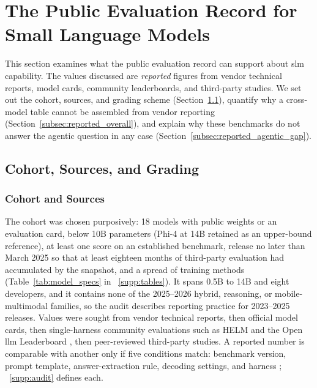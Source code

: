 
\section{The Public Evaluation Record for Small Language Models}
\label{sec:reported}

This section examines what the public evaluation record can support about \gls{slm} capability. The values discussed are \emph{reported} figures from vendor technical reports, model cards, community leaderboards, and third-party studies. We set out the cohort, sources, and grading scheme (Section~\ref{subsec:reported_protocol}), quantify why a cross-model table cannot be assembled from vendor reporting (Section~\ref{subsec:reported_overall}), and explain why these benchmarks do not answer the agentic question in any case (Section~\ref{subsec:reported_agentic_gap}).

\subsection{Cohort, Sources, and Grading}
\label{subsec:reported_protocol}

\subsubsection{Cohort and Sources}
\label{subsec:reported_model_selection}
\label{subsec:reported_sources}
The cohort was chosen purposively: 18 models with public weights or an evaluation card, below 10B parameters (Phi-4 at 14B retained as an upper-bound reference), at least one score on an established benchmark, release no later than March 2025 so that at least eighteen months of third-party evaluation had accumulated by the snapshot, and a spread of training methods (Table~\ref{tab:model_specs} in \suppsec~\ref{supp:tables}). It spans 0.5B to 14B and eight developers, and it contains none of the 2025--2026 hybrid, reasoning, or mobile-multimodal families, so the audit describes reporting practice for 2023--2025 releases. Values were sought from vendor technical reports, then official model cards, then single-harness community evaluations such as HELM \citep{liang2023helm} and the Open \gls{llm} Leaderboard \citep{hf2024openllmlb}, then peer-reviewed third-party studies. A reported number is comparable with another only if five conditions match: benchmark version, prompt template, answer-extraction rule, decoding settings, and harness \citep{biderman2024lessons}; \suppsec~\ref{supp:audit} defines each.

